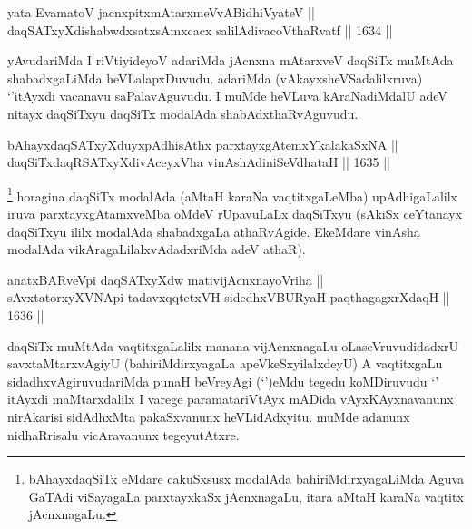 \begin{shl}
yata EvamatoV jacnxpitxmAtarxmeVvABidhiVyateV ||  \\
daqSATxyXdishabwdxsatxsAmxcacx salilAdivacoV\s thaRvatf ||  1634 ||  
\end{shl}

\begin{artha}
yAvudariMda I riVtiyideyoV adariMda jAcnxna mAtarxveV daqSiTx muMtAda shabadxgaLiMda heVLalapxDuvudu. adariMda (vAkayxsheVSadalilxruva) `\stext'itAyxdi vacanavu saPalavAguvudu. I muMde heVLuva kAraNadiMdalU adeV nitayx daqSiTxyu daqSiTx modalAda shabAdxthaRvAguvudu.
\end{artha}

\begin{shl}
bAhayxdaqSATxyXduyxpAdhisAthx parxtayxgAtemxYkalakaSxNA || \\
daqSiTxdaqRSATxyXdivAceyxVha vinAshAdiniSeVdhataH ||  1635 ||  
\end{shl}

\begin{artha}
\footnote{bAhayxdaqSiTx eMdare cakuSxsusx modalAda bahiriMdirxyagaLiMda Aguva GaTAdi viSayagaLa parxtayxkaSx jAcnxnagaLu, itara aMtaH karaNa vaqtitx jAcnxnagaLu.}
horagina daqSiTx modalAda (aMtaH karaNa vaqtitxgaLeMba) upAdhigaLalilx iruva parxtayxgAtamxveMba oMdeV rUpavuLaLx daqSiTxyu (sAkiSx ceYtanayx daqSiTxyu ililx modalAda shabadxgaLa athaRvAgide. EkeMdare vinAsha modalAda vikAragaLilalxvAdadxriMda adeV athaR).
\end{artha}


\begin{shl}
anatxBARveV\s pi daqSATxyXdw mativijAcnxnayoVriha || \\
sAvxtatorxyXVNApi tadavxqqtetxVH sidedhxVBURyaH paqthagagxrXdaqH ||  1636 ||  
\end{shl}

\begin{artha}
daqSiTx muMtAda vaqtitxgaLalilx manana vijAcnxnagaLu oLaseVruvudidadxrU savxtaMtarxvAgiyU (bahiriMdirxyagaLa apeVkeSxyilalxdeyU) A vaqtitxgaLu sidadhxvAgiruvudariMda punaH beVreyAgi (`\stext')eMdu tegedu koMDiruvudu `\stext' itAyxdi maMtarxdalilx I varege paramatariVtAyx mADida vAyxKAyxnavanunx nirAkarisi sidAdhxMta pakaSxvanunx heVLidAdxyitu. muMde adanunx nidhaRrisalu vicAravanunx tegeyutAtxre. 
\end{artha}

